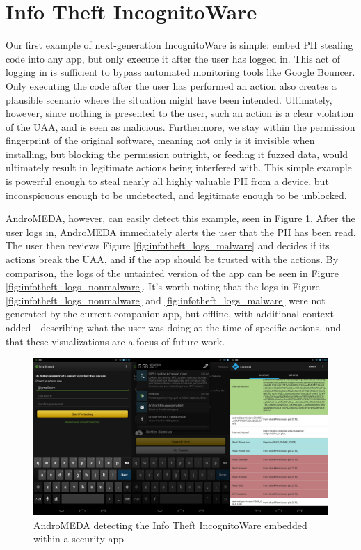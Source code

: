 \section{Info Theft IncognitoWare}
Our first example of next-generation IncognitoWare is simple: embed PII stealing code into any app, but only execute it after the user has logged in. This act of logging in is sufficient to bypass automated monitoring tools like Google Bouncer. Only executing the code after the user has performed an action also creates a plausible scenario where the situation might have been intended. Ultimately, however, since nothing is presented to the user, such an action is a clear violation of the UAA, and is seen as malicious. Furthermore, we stay within the permission fingerprint of the original software, meaning not only is it invisible when installing, but blocking the permission outright, or feeding it fuzzed data, would ultimately result in legitimate actions being interfered with. This simple example is powerful enough to steal nearly all highly valuable PII from a device, but inconspicuous enough to be undetected, and legitimate enough to be unblocked.

AndroMEDA, however, can easily detect this example, seen in Figure \ref{fig:infotheft_visual}. After the user logs in, AndroMEDA immediately alerts the user that the PII has been read. The user then reviews Figure \ref{fig:infotheft_logs_malware} and decides if its actions break the UAA, and if the app should be trusted with the actions. By comparison, the logs of the untainted version of the app can be seen in Figure \ref{fig:infotheft_logs_nonmalware}. It's worth noting that the logs in Figure \ref{fig:infotheft_logs_nonmalware} and \ref{fig:infotheft_logs_malware} were not generated by the current companion app, but offline, with additional context added - describing what the user was doing at the time of specific actions, and that these visualizations are a focus of future work.

\begin{figure}[h]
\begin{center}
\includegraphics[width=1.0\columnwidth]{figs/lookout_detection}
\caption{AndroMEDA detecting the Info Theft IncognitoWare embedded within a security app }
\label{fig:infotheft_visual}
\end{center}
\end{figure}


